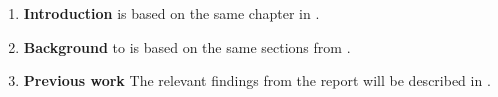 \begin{enumerate}
    \item \textbf{Introduction}  is based on the same chapter in \cite{torjenygaardeikenesDesigningRISCVReference2023}.
    \item \textbf{Background}  to  is based on the same sections from \cite{torjenygaardeikenesDesigningRISCVReference2023}.
    \item \textbf{Previous work} The relevant findings from the report will be described in .
\end{enumerate}


%
